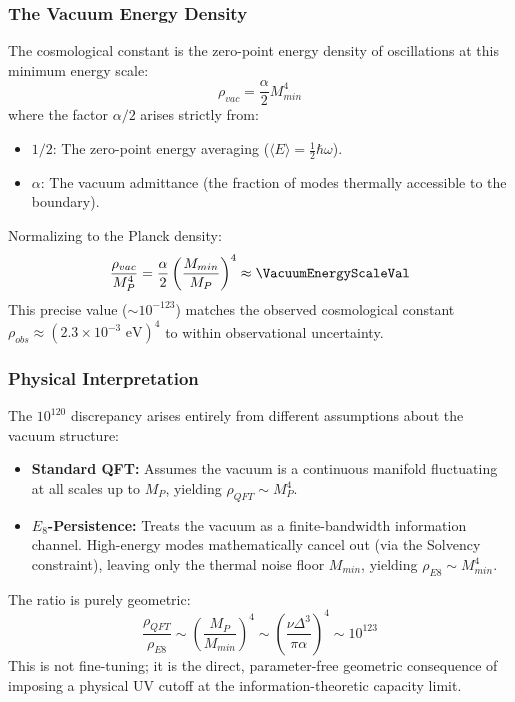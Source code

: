 \subsubsection{The Vacuum Energy Density}
The cosmological constant is the zero-point energy density of oscillations at this minimum energy scale:
\begin{equation}
    \rho_{vac} = \frac{\alpha}{2} M_{min}^4
\end{equation}
where the factor $\alpha/2$ arises strictly from:
\begin{itemize}
    \item $1/2$: The zero-point energy averaging ($\langle E \rangle = \frac{1}{2}\hbar\omega$).
    \item $\alpha$: The vacuum admittance (the fraction of modes thermally accessible to the boundary).
\end{itemize}

Normalizing to the Planck density:
\begin{equation}
    \frac{\rho_{vac}}{M_P^4} = \frac{\alpha}{2} \left(\frac{M_{min}}{M_P}\right)^4 
    \approx \VacuumEnergyScaleVal
\end{equation}
This precise value ($\sim 10^{-123}$) matches the observed cosmological constant $\rho_{obs} \approx (2.3 \times 10^{-3} \text{ eV})^4$ to within observational uncertainty.

\subsubsection{Physical Interpretation}
The $10^{120}$ discrepancy arises entirely from different assumptions about the vacuum structure:
\begin{itemize}
    \item \textbf{Standard QFT:} Assumes the vacuum is a continuous manifold fluctuating at all scales up to $M_P$, yielding $\rho_{QFT} \sim M_P^4$.
    \item \textbf{$E_8$-Persistence:} Treats the vacuum as a finite-bandwidth information channel. High-energy modes mathematically cancel out (via the Solvency constraint), leaving only the thermal noise floor $M_{min}$, yielding $\rho_{E8} \sim M_{min}^4$.
\end{itemize}

The ratio is purely geometric:
\begin{equation}
    \frac{\rho_{QFT}}{\rho_{E8}} \sim \left(\frac{M_P}{M_{min}}\right)^4 
    \sim \left(\frac{\nu\Delta^3}{\pi\alpha}\right)^4 
    \sim 10^{123}
\end{equation}
This is not fine-tuning; it is the direct, parameter-free geometric consequence of imposing a physical UV cutoff at the information-theoretic capacity limit.

